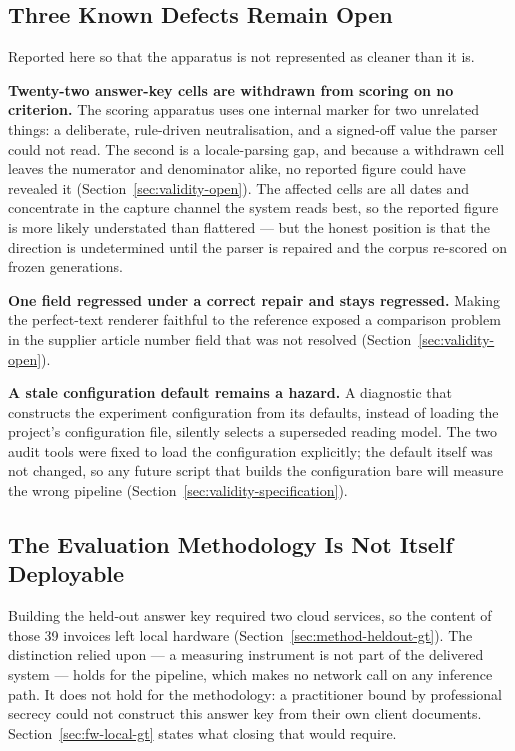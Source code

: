\subsection{Three Known Defects Remain Open}
\label{sec:lim-open-defects}

Reported here so that the apparatus is not represented as cleaner than it is.

\textbf{Twenty-two answer-key cells are withdrawn from scoring on no criterion.} The scoring
apparatus uses one internal marker for two unrelated things: a deliberate, rule-driven
neutralisation, and a signed-off value the parser could not read. The second is a locale-parsing
gap, and because a withdrawn cell leaves the numerator and denominator alike, no reported figure
could have revealed it (Section~\ref{sec:validity-open}). The affected cells are all dates and
concentrate in the capture channel the system reads best, so the reported figure is more likely
understated than flattered --- but the honest position is that the direction is undetermined
until the parser is repaired and the corpus re-scored on frozen generations.

\textbf{One field regressed under a correct repair and stays regressed.} Making the
perfect-text renderer faithful to the reference exposed a comparison problem in the supplier
article number field that was not resolved (Section~\ref{sec:validity-open}).

\textbf{A stale configuration default remains a hazard.} A diagnostic that constructs the
experiment configuration from its defaults, instead of loading the project's configuration file,
silently selects a superseded reading model. The two audit tools were fixed to load the
configuration explicitly; the default itself was not changed, so any future script that builds
the configuration bare will measure the wrong pipeline (Section~\ref{sec:validity-specification}).

\subsection{The Evaluation Methodology Is Not Itself Deployable}
\label{sec:lim-cloud-gt}

Building the held-out answer key required two cloud services, so the content of those 39 invoices
left local hardware (Section~\ref{sec:method-heldout-gt}). The distinction relied upon --- a measuring
instrument is not part of the delivered system --- holds for the pipeline, which makes no network
call on any inference path. It does not hold for the methodology: a practitioner bound by
professional secrecy could not construct this answer key from their own client documents.
Section~\ref{sec:fw-local-gt} states what closing that would require.

